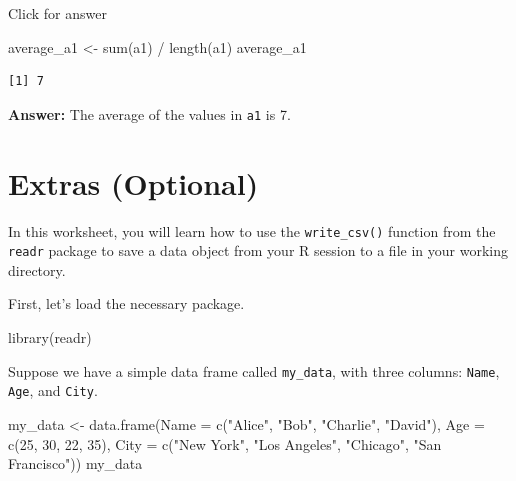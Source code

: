 \documentclass[
]{book}
\newenvironment{Shaded}{\begin{snugshade}}{\end{snugshade}}
\newcommand{\AttributeTok}[1]{\textcolor[rgb]{0.77,0.63,0.00}{#1}}
\newcommand{\DecValTok}[1]{\textcolor[rgb]{0.00,0.00,0.81}{#1}}
\newcommand{\FunctionTok}[1]{\textcolor[rgb]{0.00,0.00,0.00}{#1}}
\newcommand{\NormalTok}[1]{#1}
\newcommand{\OtherTok}[1]{\textcolor[rgb]{0.56,0.35,0.01}{#1}}
\newcommand{\SpecialCharTok}[1]{\textcolor[rgb]{0.00,0.00,0.00}{#1}}
\newcommand{\StringTok}[1]{\textcolor[rgb]{0.31,0.60,0.02}{#1}}
\begin{document}
Click for answer

\begin{Shaded}
\begin{Highlighting}[]
\NormalTok{average\_a1 }\OtherTok{\textless{}{-}} \FunctionTok{sum}\NormalTok{(a1) }\SpecialCharTok{/} \FunctionTok{length}\NormalTok{(a1)}
\NormalTok{average\_a1}
\end{Highlighting}
\end{Shaded}

\begin{verbatim}
[1] 7
\end{verbatim}

\textbf{Answer:} The average of the values in \texttt{a1} is 7.

\hypertarget{extras-optional-1}{%
\section{Extras (Optional)}\label{extras-optional-1}}

In this worksheet, you will learn how to use the \texttt{write\_csv()} function from the \texttt{readr} package to save a data object from your R session to a file in your working directory.

First, let's load the necessary package.

\begin{Shaded}
\begin{Highlighting}[]
\FunctionTok{library}\NormalTok{(readr)}
\end{Highlighting}
\end{Shaded}

Suppose we have a simple data frame called \texttt{my\_data}, with three columns: \texttt{Name}, \texttt{Age}, and \texttt{City}.

\begin{Shaded}
\begin{Highlighting}[]
\NormalTok{my\_data }\OtherTok{\textless{}{-}} \FunctionTok{data.frame}\NormalTok{(}\AttributeTok{Name =} \FunctionTok{c}\NormalTok{(}\StringTok{"Alice"}\NormalTok{, }\StringTok{"Bob"}\NormalTok{, }\StringTok{"Charlie"}\NormalTok{, }\StringTok{"David"}\NormalTok{),}
                      \AttributeTok{Age =} \FunctionTok{c}\NormalTok{(}\DecValTok{25}\NormalTok{, }\DecValTok{30}\NormalTok{, }\DecValTok{22}\NormalTok{, }\DecValTok{35}\NormalTok{),}
                      \AttributeTok{City =} \FunctionTok{c}\NormalTok{(}\StringTok{"New York"}\NormalTok{, }\StringTok{"Los Angeles"}\NormalTok{, }\StringTok{"Chicago"}\NormalTok{, }\StringTok{"San Francisco"}\NormalTok{))}
\NormalTok{my\_data}
\end{Highlighting}
\end{Shaded}
\end{document}
